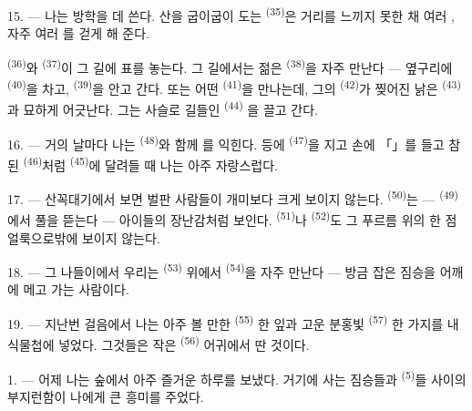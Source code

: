 \VUsaut{3.0mm}
\VUsaut{3.0mm}

15. --- 나는 방학을  데 쓴다. 산을 굽이굽이 도는 
\textsuperscript{(35)}은 거리를 느끼지 못한 채 여러 , 자주 여러
를 걷게 해 준다.

 \textsuperscript{(36)}와  \textsuperscript{(37)}이 그
길에 표를 놓는다. 그 길에서는 젊은  \textsuperscript{(38)}을 자주
만난다 — 옆구리에  \textsuperscript{(40)}을 차고, 
\textsuperscript{(39)}을 안고 간다. 또는 어떤  \textsuperscript{(41)}을
만나는데, 그의  \textsuperscript{(42)}가 찢어진 낡은 
\textsuperscript{(43)}과 묘하게 어긋난다. 그는 사슬로 길들인  \textsuperscript{(44)}
을 끌고 간다.

\VUsaut{3.0mm}

16. --- 거의 날마다 나는  \textsuperscript{(48)}와 함께 를
익힌다. 등에  \textsuperscript{(47)}을 지고 손에 「」를 들고
참된  \textsuperscript{(46)}처럼  \textsuperscript{(45)}에 달려들
때 나는 아주 자랑스럽다.

17. --- 산꼭대기에서 보면 벌판 사람들이 개미보다 크게 보이지 않는다. 
\textsuperscript{(50)}는 —  \textsuperscript{(49)}에서 풀을 뜯는다 — 아이들의
장난감처럼 보인다.  \textsuperscript{(51)}나 
\textsuperscript{(52)}도 그 푸르름 위의 한 점 얼룩으로밖에 보이지 않는다.

18. --- 그 나들이에서 우리는  \textsuperscript{(53)} 위에서
 \textsuperscript{(54)}을 자주 만난다 — 방금 잡은 짐승을 어깨에
메고 가는 사람이다.

19. --- 지난번 걸음에서 나는 아주 볼 만한  \textsuperscript{(55)} 한 잎과
고운 분홍빛  \textsuperscript{(57)} 한 가지를 내 식물첩에 넣었다. 그것들은 작은
 \textsuperscript{(56)} 어귀에서 딴 것이다.

\VUsaut{3.0mm}
\VUsaut{3.0mm}

\VUsaut{3.0mm}

1. --- 어제 나는 숲에서 아주 즐거운 하루를 보냈다. 거기에 사는 짐승들과 
\textsuperscript{(5)}들 사이의 부지런함이 나에게 큰 흥미를 주었다.

